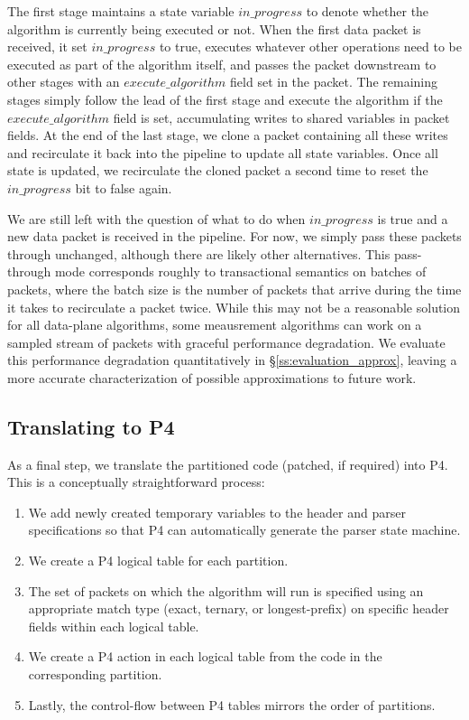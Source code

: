 The first stage maintains a state variable $in\_progress$ to denote whether the
algorithm is currently being executed or not. When the first data packet is
received, it set $in\_progress$ to true, executes whatever other operations
need to be executed as part of the algorithm itself, and passes the packet
downstream to other stages with an $execute\_algorithm$ field set in the
packet. The remaining stages simply follow the lead of the first stage and
execute the algorithm if the $execute\_algorithm$ field is set, accumulating
writes to shared variables in packet fields. At the end of the last stage, we
clone a packet containing all these writes and recirculate it back into the
pipeline to update all state variables. Once all state is updated, we
recirculate the cloned packet a second time to reset the $in\_progress$ bit to
false again.

We are still left with the question of what to do when $in\_progress$ is true
and a new data packet is received in the pipeline. For now, we simply pass
these packets through unchanged, although there are likely other alternatives.
This pass-through mode corresponds roughly to transactional semantics on
batches of packets, where the batch size is the number of packets that arrive
during the time it takes to recirculate a packet twice. While this may not be a
reasonable solution for all data-plane algorithms, some meausrement algorithms
can work on a sampled stream of packets with graceful performance degradation.
We evaluate this performance degradation quantitatively in
\S\ref{ss:evaluation_approx}, leaving a more accurate characterization of possible
approximations to future work.

\subsection{Translating to P4}
As a final step, we translate the partitioned code (patched, if required)
into P4. This is a conceptually straightforward process:
\begin{enumerate}
\item We add newly created temporary variables to the header and parser
specifications so that P4 can automatically generate the parser state machine.
\item We create a P4 logical table for each partition.
\item The set of packets on which the algorithm will run is specified using
an appropriate match type (exact, ternary, or longest-prefix) on specific
header fields within each logical table.
\item We create a P4 action in each logical table from the code in the
corresponding partition.
\item Lastly, the control-flow between P4 tables mirrors the order of
partitions.
\end{enumerate}

%
